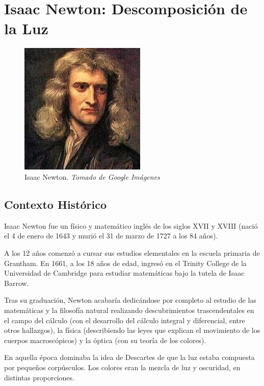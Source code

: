 \documentclass[journal]{IEEEtran}
\begin{document}
\hfill \break
\section{Isaac Newton: Descomposición de la Luz}

\begin{center}
  \begin{figure}[h!]
  \includegraphics[width=60mm]{newton.jpg}
  \caption{Isaac Newton. \emph{Tomado de Google Imágenes}}
  \end{figure}
\end{center}

\subsection{Contexto Histórico}

Isaac Newton fue un físico y matemático inglés de los siglos XVII y XVIII (nació el 4 de enero de 1643 y murió el 31 de marzo de 1727 a los 84 años).

A los 12 años comenzó a cursar sus estudios elementales en la escuela primaria de Grantham. En 1661, a los 18 años de edad, ingresó en el Trinity College de la Universidad de Cambridge para estudiar matemáticas bajo la tutela de Isaac Barrow.

Tras su graduación, Newton acabaría dedicándose por completo al estudio de las matemáticas y la filosofía natural realizando descubrimientos trascendentales en el campo del cálculo (con el desarrollo del cálculo integral y diferencial, entre otros hallazgos), la física (describiendo las leyes que explican el movimiento de los cuerpos macroscópicos) y la óptica (con su teoría de los colores).

En aquella época dominaba la idea de Descartes de que la luz estaba compuesta por pequeños corpúsculos. Los colores eran la mezcla de luz y oscuridad, en distintas proporciones.
\end{document}
